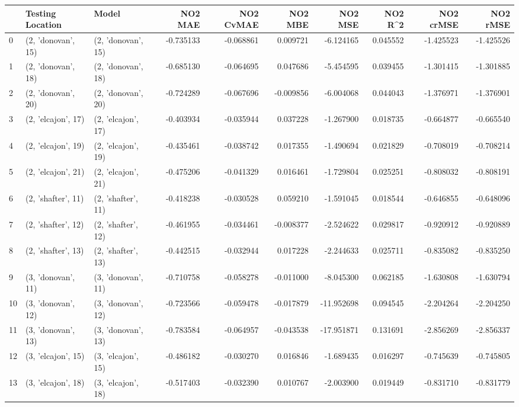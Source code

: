\begin{tabular}{lllrrrrrrr}
\toprule
{} &    Testing Location &               Model &   NO2 MAE &  NO2 CvMAE &   NO2 MBE &    NO2 MSE &   NO2 R\textasciicircum2 &  NO2 crMSE &  NO2 rMSE \\
\midrule
0  &  (2, 'donovan', 15) &  (2, 'donovan', 15) & -0.735133 &  -0.068861 &  0.009721 &  -6.124165 &  0.045552 &  -1.425523 & -1.425526 \\
1  &  (2, 'donovan', 18) &  (2, 'donovan', 18) & -0.685130 &  -0.064695 &  0.047686 &  -5.454595 &  0.039455 &  -1.301415 & -1.301885 \\
2  &  (2, 'donovan', 20) &  (2, 'donovan', 20) & -0.724289 &  -0.067696 & -0.009856 &  -6.004068 &  0.044043 &  -1.376971 & -1.376901 \\
3  &  (2, 'elcajon', 17) &  (2, 'elcajon', 17) & -0.403934 &  -0.035944 &  0.037228 &  -1.267900 &  0.018735 &  -0.664877 & -0.665540 \\
4  &  (2, 'elcajon', 19) &  (2, 'elcajon', 19) & -0.435461 &  -0.038742 &  0.017355 &  -1.490694 &  0.021829 &  -0.708019 & -0.708214 \\
5  &  (2, 'elcajon', 21) &  (2, 'elcajon', 21) & -0.475206 &  -0.041329 &  0.016461 &  -1.729804 &  0.025251 &  -0.808032 & -0.808191 \\
6  &  (2, 'shafter', 11) &  (2, 'shafter', 11) & -0.418238 &  -0.030528 &  0.059210 &  -1.591045 &  0.018544 &  -0.646855 & -0.648096 \\
7  &  (2, 'shafter', 12) &  (2, 'shafter', 12) & -0.461955 &  -0.034461 & -0.008377 &  -2.524622 &  0.029817 &  -0.920912 & -0.920889 \\
8  &  (2, 'shafter', 13) &  (2, 'shafter', 13) & -0.442515 &  -0.032944 &  0.017228 &  -2.244633 &  0.025711 &  -0.835082 & -0.835250 \\
9  &  (3, 'donovan', 11) &  (3, 'donovan', 11) & -0.710758 &  -0.058278 & -0.011000 &  -8.045300 &  0.062185 &  -1.630808 & -1.630794 \\
10 &  (3, 'donovan', 12) &  (3, 'donovan', 12) & -0.723566 &  -0.059478 & -0.017879 & -11.952698 &  0.094545 &  -2.204264 & -2.204250 \\
11 &  (3, 'donovan', 13) &  (3, 'donovan', 13) & -0.783584 &  -0.064957 & -0.043538 & -17.951871 &  0.131691 &  -2.856269 & -2.856337 \\
12 &  (3, 'elcajon', 15) &  (3, 'elcajon', 15) & -0.486182 &  -0.030270 &  0.016846 &  -1.689435 &  0.016297 &  -0.745639 & -0.745805 \\
13 &  (3, 'elcajon', 18) &  (3, 'elcajon', 18) & -0.517403 &  -0.032390 &  0.010767 &  -2.003900 &  0.019449 &  -0.831710 & -0.831779 \\

\end{tabular}
